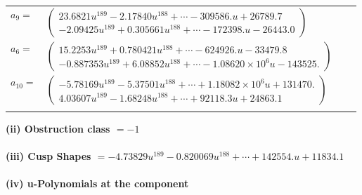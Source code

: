 \documentclass[1p]{elsarticle_modified}
\theoremstyle{definition}
\begin{document}
\begin{tabular}{m{7pt} m{180pt} m{7pt} m{180pt} }
\flushright $a_{9}=$&$\begin{pmatrix}23.6821 u^{189}-2.17840 u^{188}+\cdots-309586. u+26789.7\\-2.09425 u^{189}+0.305661 u^{188}+\cdots-172398. u-26443.0\end{pmatrix}$ \\
\flushright $a_{6}=$&$\begin{pmatrix}15.2253 u^{189}+0.780421 u^{188}+\cdots-624926. u-33479.8\\-0.887353 u^{189}+6.08852 u^{188}+\cdots-1.08620\times10^{6} u-143525.\end{pmatrix}$ \\
\flushright $a_{10}=$&$\begin{pmatrix}-5.78169 u^{189}-5.37501 u^{188}+\cdots+1.18082\times10^{6} u+131470.\\4.03607 u^{189}-1.68248 u^{188}+\cdots+92118.3 u+24863.1\end{pmatrix}$\\&\end{tabular}
\flushleft \textbf{(ii) Obstruction class $= -1$}\\~\\
\flushleft \textbf{(iii) Cusp Shapes $= -4.73829 u^{189}-0.820069 u^{188}+\cdots+142554. u+11834.1$}\\~\\
\newpage\renewcommand{\arraystretch}{1}
\flushleft \textbf{(iv) u-Polynomials at the component}\newline \\
\end{document}
